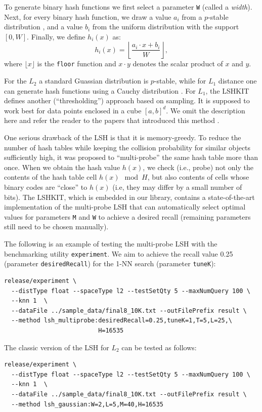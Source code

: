 \documentclass[runningheads,a4paper]{llncs}
\newcommand{\ttt}[1]{\texttt{#1}}
\begin{document}
{To generate binary hash functions we first select a parameter \texttt{W} (called a \emph{width}).
Next, for every binary hash function, we draw a value $a_i$ from a $p$-stable distribution \cite{datar2004locality},
and a value $b_i$ from the uniform distribution with the support $[0, W]$.
Finally, we define $h_i(x)$ as:
$$
h_i(x) = \left\lfloor \frac{ a_i \cdot x + b_i  }{W}\right\rfloor,
$$
where $\lfloor x \rfloor$  is the \texttt{floor} function
and $x \cdot y$ denotes the scalar product of $x$ and $y$.

For the $L_2$ a standard Guassian distribution is $p$-stable, while for $L_1$ distance one can generate hash functions using a Cauchy distribution \cite{datar2004locality}.
For $L_1$, the LSHKIT defines another (``thresholding'') approach based on sampling.
It is supposed to work best for data points enclosed in  a cube $[a,b]^d$.
We omit the description here and refer the reader to the papers that introduced this method \cite{wang2007sizing,lv2004image}.

One serious drawback of the LSH is that it is memory-greedy.
To reduce the number of hash tables while keeping the collision probability for similar objects
sufficiently high, it was proposed to ``multi-probe'' the same hash table more than once.
When we obtain the hash value $h(x)$, we check (i.e., probe) not only the contents
of the hash table cell $h(x) \mod H$, but also contents of cells 
whose binary codes are ``close'' to $h(x)$ (i.e, they may differ by a small number of bits).
The LSHKIT, which is embedded in our library, contains a state-of-the-art
implementation of the multi-probe LSH that can automatically select
optimal values for parameters \texttt{M} and \texttt{W} to achieve a desired recall (remaining
parameters still need to be chosen manually). 

The following is an example of testing the multi-probe LSH with the benchmarking utility \ttt{experiment}.
We aim to achieve the recall value 0.25 (parameter \ttt{desiredRecall}) 
for the 1-NN search (parameter \ttt{tuneK}):
{
\footnotesize
\begin{verbatim}
release/experiment \
  --distType float --spaceType l2 --testSetQty 5 --maxNumQuery 100 \
  --knn 1  \
  --dataFile ../sample_data/final8_10K.txt --outFilePrefix result \
  --method lsh_multiprobe:desiredRecall=0.25,tuneK=1,T=5,L=25,\
                          H=16535
\end{verbatim}
}

The classic version of the LSH for $L_2$ can be tested as follows:
{
\footnotesize
\begin{verbatim}
release/experiment \
  --distType float --spaceType l2 --testSetQty 5 --maxNumQuery 100 \
  --knn 1  \
  --dataFile ../sample_data/final8_10K.txt --outFilePrefix result \
  --method lsh_gaussian:W=2,L=5,M=40,H=16535
\end{verbatim}
}

}
\end{document}
